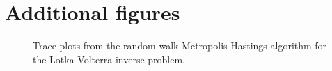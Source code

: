 \documentclass[11pt,a4paper]{report}
\begin{document}
\chapter{Additional figures}
\label{appendix:figures}

\begin{figure}[h]
\centering
{}
\caption{Trace plots from the random-walk Metropolis-Hastings algorithm for the Lotka-Volterra inverse problem.
\label{fig:lotka-volterra:trace-plots}}
\end{figure}
\end{document}
